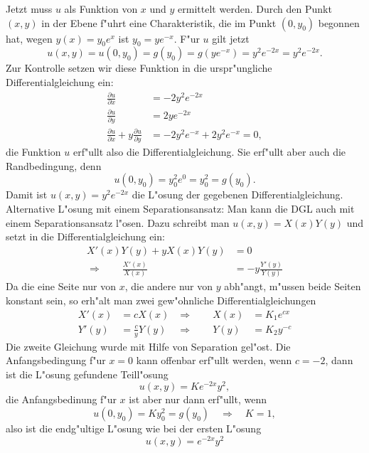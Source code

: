 {\begin{loesung}
Jetzt muss $u$ als Funktion von $x$ und $y$ ermittelt werden.
Durch den Punkt $(x,y)$ in der Ebene f"uhrt eine Charakteristik,
die im Punkt $(0,y_0)$ begonnen hat, wegen $y(x)=y_0e^x$ ist
$y_0=ye^{-x}$. F"ur $u$ gilt jetzt
\[
u(x,y)=u(0,y_0)=g(y_0)=g(ye^{-x})=y^2e^{-2x}=y^2e^{-2x}.
\]
Zur Kontrolle setzen wir diese Funktion in die urspr"ungliche
Differentialgleichung ein:
\begin{align*}
\frac{\partial u}{\partial x}
&=
-2y^2e^{-2x}
\\
\frac{\partial u}{\partial y}
&=
2ye^{-2x}
\\
\frac{\partial u}{\partial x}
+y
\frac{\partial u}{\partial y}
&=
-2y^2e^{-x}
+2y^2e^{-x}
=0,
\end{align*}
die Funktion $u$ erf"ullt also die Differentialgleichung. Sie erf"ullt
aber auch die Randbedingung, denn
\[
u(0,y_0)=y_0^2e^0=y_0^2=g(y_0).
\]
Damit ist $u(x,y)=y^2e^{-2x}$ die L"osung der gegebenen Differentialgleichung.
Alternative L"osung mit einem Separationsansatz: Man kann die DGL auch
mit einem Separationsansatz l"osen. Dazu schreibt man $u(x,y)=X(x)Y(y)$
und setzt in die Differentialgleichung ein:
\begin{align*}
X'(x)Y(y)+yX(x)Y(y)&=0\\
\Rightarrow\qquad \frac{X'(x)}{X(x)}&=-y\frac{Y'(y)}{Y(y)}
\end{align*}
Da die eine Seite nur von $x$, die andere nur von $y$ abh"angt, m"ussen
beide Seiten konstant sein, so erh"alt man zwei gew"ohnliche
Differentialgleichungen
\begin{align*}
X'(x)&=cX(x)&\Rightarrow\qquad X(x)&=K_1e^{cx}\\
Y'(y)&=\frac{c}{y}Y(y)&\Rightarrow\qquad Y(y)&=K_2y^{-c}
\end{align*}
Die zweite Gleichung wurde mit Hilfe von Separation gel"ost.
Die Anfangsbedingung f"ur $x=0$ kann offenbar erf"ullt werden,
wenn $c=-2$, dann ist die L"osung gefundene Teill"osung
\[
u(x,y)=Ke^{-2x}y^2,
\]
die Anfangsbedinung f"ur $x$ ist aber nur dann erf"ullt, wenn
\[
u(0,y_0)=Ky_0^2=g(y_0)\quad\Rightarrow\quad K=1,
\]
also ist die endg"ultige L"osung wie bei der ersten L"osung
\[
u(x,y)=e^{-2x}y^2
\]
\end{loesung}

}{ }
